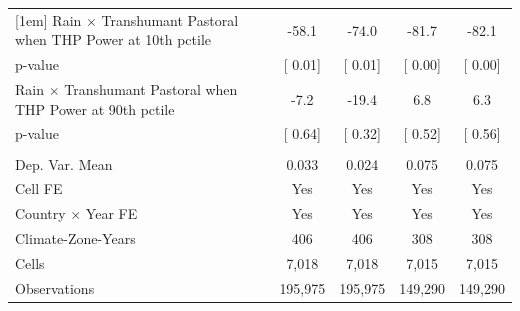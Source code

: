 {\begin{tabular}{l*{4}{c}}
[1em] \hspace{15pt} Rain $\times$ Transhumant Pastoral when THP Power at 10th pctile&       -58.1         &       -74.0         &       -81.7         &       -82.1         \\
\hspace{25pt} p-value& [     0.01]         & [     0.01]         & [     0.00]         & [     0.00]         \\
[1em]\hspace{15pt} Rain $\times$ Transhumant Pastoral when THP Power at 90th pctile&        -7.2         &       -19.4         &         6.8         &         6.3         \\
\hspace{25pt} p-value& [     0.64]         & [     0.32]         & [     0.52]         & [     0.56]         \\
\hline \\ Dep. Var. Mean&       0.033         &       0.024         &       0.075         &       0.075         \\
Cell FE             &         Yes         &         Yes         &         Yes         &         Yes         \\
Country $\times$ Year FE&         Yes         &         Yes         &         Yes         &         Yes         \\
Climate-Zone-Years  &         406         &         406         &         308         &         308         \\
Cells               &       7,018         &       7,018         &       7,015         &       7,015         \\
Observations        &     195,975         &     195,975         &     149,290         &     149,290         \\
\bottomrule
\end{tabular}
}
